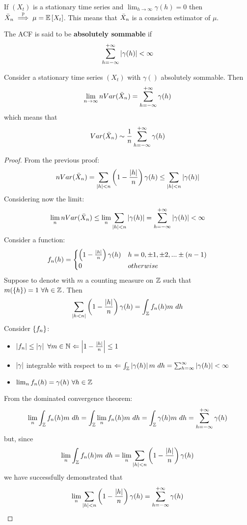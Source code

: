 \begin{corollary}
    If $(X_t)$ is a stationary time series and $\lim_{h\to\infty}\gamma(h)=0$ then $\bar{X}_n\stackrel{\mathbb{P}}{\implies}\mu=\mathbb{E}\left[X_t\right]$. This means that $\bar{X}_n$ is a consisten estimator of $\mu$.
\end{corollary}

\begin{definition}
    The ACF is said to be \textbf{absolutely sommable} if
    \[
        \sum_{h=-\infty}^{+\infty}\left|\gamma(h)\right|<\infty  
    \]
\end{definition}

\begin{theorem}
    Consider a stationary time series $(X_t)$ with $\gamma()$ absolutely sommable. Then
    \[
        \lim_{n\to\infty}nVar(\bar{X}_n)=\sum_{h=-\infty}^{+\infty}\gamma(h)  
    \]
    which means that
    \[
        Var(\bar{X}_n)\sim\frac{1}{n}\sum_{h=-\infty}^{+\infty}\gamma(h)  
    \]
\end{theorem}

\begin{proof}
    From the previous proof:
    \[
        nVar(\bar{X}_n)=\sum_{\left|h\right|<n}\left(1-\frac{\left|h\right|}{n}\right)\gamma(h)\le\sum_{\left|h\right|<n}\left|\gamma(h)\right|
    \]
    Considering now the limit:
    \[
        \lim_{n}nVar(\bar{X}_n)\le\lim_{n}\sum_{\left|h\right|<n}\left|\gamma(h)\right|=\sum_{h=-\infty}^{+\infty}\left|\gamma(h)\right|<\infty
    \]
    Consider a function:
    \[
        f_n(h)=\begin{cases}
            \left(1-\frac{\left|h\right|}{n}\right)\gamma(h)&h=0,\pm1,\pm2,...\pm(n-1)\\
            0&otherwise\\
        \end{cases}  
    \]
    Suppose to denote with $m$ a counting measure on $\mathbb{Z}$ such that $m(\left\{h\right\})=1\ \forall h\in\mathbb{Z}$. Then
    \[
        \sum_{\abs{h<n}}\left(1-\frac{\abs{h}}{n}\right)\gamma(h)=\int_{\Z}f_n(h)m\ dh  
    \]
    Consider $\left\{f_n\right\}$:
    \begin{itemize}
        \item $\left|f_n\right|\le\left|\gamma\right|\ \forall m\in\mathbb{N}\Leftarrow\left|1-\frac{\left|h\right|}{n}\right|\le1$
        \item $\left|\gamma\right|$ integrable with respect to m $\Leftarrow\int_{\Z}\abs{\gamma(h)}m\ dh=\sum_{h=\infty}^{\infty}\abs{\gamma(h)}<\infty$
        \item $\lim_{n}f_n(h)=\gamma(h)\ \forall h\in\mathbb{Z}$
    \end{itemize}
    From the dominated convergence theorem:
    \[
        \lim_n\int_{\Z}f_n(h)m\ dh=\int_\Z\lim_nf_n(h)m\ dh=\int_\Z\gamma(h)m\ dh=\sum_{h=-\infty}^{+\infty}\gamma(h)
    \]
    but, since
    \[
        \lim_n\int_{\Z}f_n(h)m\ dh=\lim_n\sum_{\abs{h}<n}\left(1-\frac{\abs{h}}{n}\right)\gamma(h)
    \]
    we have successfully demonstrated that
    \[
        \lim_n\sum_{\left|h\right|<n}\left(1-\frac{\left|h\right|}{n}\right)\gamma(h)=\sum_{h=-\infty}^{+\infty}\gamma(h)
    \]
\end{proof}

